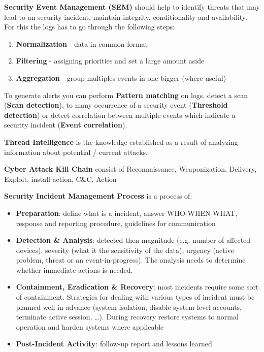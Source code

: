 \documentclass[11pt,twoside,landscape]{article}
\begin{document}
\begin{multicols}{4}
\textbf{Security Event Management (SEM)} should help to identify threats that may lead to an security incident, maintain integrity, conditionality and availability. For this the logs has to go through the following steps: 
\begin{enumerate}
\item \textbf{Normalization} - data in common format
\item \textbf{Filtering} - assigning priorities and set a large amount aside
\item \textbf{Aggregation} - group multiples events in one bigger (where useful)
\end{enumerate}
To generate alerts you can perform \textbf{Pattern matching} on logs, detect a scan (\textbf{Scan detection}), to many occurrence of a security event (\textbf{Threshold detection}) or detect correlation between multiple events which indicate a security incident (\textbf{Event correlation}).

\textbf{Thread Intelligence} is the knowledge established as a result of analyzing information about potential / current attacks.

\textbf{Cyber Attack Kill Chain} consist of Reconnaissance, Weaponization, Delivery, Exploit, install action, C\&C, Action

\textbf{Security Incident Management Process} is a process of:
\begin{itemize}
\item \textbf{Preparation}: define what is a incident, answer WHO-WHEN-WHAT, response and reporting procedure, guidelines for communication
\item \textbf{Detection \& Analysis}: detected then magnitude (e.g. number of affected devices), severity (what it the sensitivity of the data), urgency (active problem, threat or an event-in-progress). The analysis needs to determine whether immediate actions is needed.
\item \textbf{Containment, Eradication \& Recovery}: most incidents require some sort of containment. Strategies for dealing with various types of incident must be planned well in advance (system isolation, disable system-level accounts, terminate active session, \ldots{}). During recovery restore systems to normal operation and harden systems where applicable
\item \textbf{Post-Incident Activity}: follow-up report and lessons learned
\end{itemize}



\end{multicols}
\end{document}
